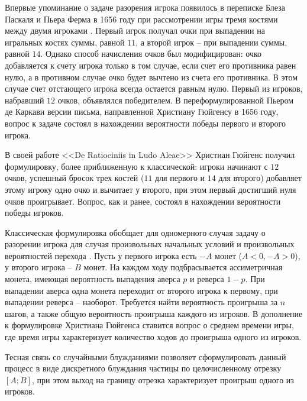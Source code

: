 Впервые упоминание о задаче разорения игрока появилось в переписке Блеза Паскаля и Пьера Ферма в 1656 году при рассмотрении игры тремя костями между двумя игроками \cite{renyi_1980}. Первый игрок получал очки при выпадении на игральных костях суммы, равной $11$, а второй игрок -- при выпадении суммы, равной $14$. Однако способ начисления очков был модифицирован: очко добавляется к счету игрока только в том случае, если счет его противника равен нулю, а в противном случае очко будет вычтено из счета его противника. В этом случае счет отстающего игрока всегда остается равным нулю. Первый из игроков, набравший $12$ очков, объявлялся победителем. В переформулированной Пьером де Каркави версии письма, направленной Христиану Гюйгенсу в 1656 году, вопрос к задаче состоял в нахождении вероятности победы первого и второго игрока. 

В своей работе <<De Ratiociniis in Ludo Aleae>> Христиан Гюйгенс \cite{hald_history_2003,huygens_christiani_1714} получил формулировку, более приближенную к классической: игроки начинают с $12$ очков, успешный бросок  трех костей ($11$ для первого и $14$ для второго) добавляет этому игроку одно очко и вычитает у второго, при этом первый достигший нуля очков проигрывает. Вопрос, как и ранее, состоял в нахождении вероятности победы игроков. 

Классическая формулировка обобщает для одномерного случая задачу о разорении игрока для случая произвольных начальных условий и произвольных вероятностей перехода \cite{feller_introduction_1968}. Пусть у первого игрока есть $-A$ монет ($A < 0, -A > 0$), у второго игрока -- $B$ монет. На каждом ходу подбрасывается ассиметричная монета, имеющая вероятность выпадения аверса $p$ и реверса $1-p$. При выпадении аверса одна монета переходит от второго игрока к первому, при выпадении реверса -- наоборот. Требуется найти вероятность проигрыша за $n$ шагов, а также общую вероятность проигрыша каждого из игроков. В дополнение к формулировке Христиана Гюйгенса ставится вопрос о среднем времени игры, где время игры характеризует количество ходов до проигрыша одного из игроков.

Тесная связь со случайными блужданиями позволяет сформулировать данный процесс в виде дискретного блуждания частицы по целочисленному отрезку $[A; B]$, при этом выход на границу отрезка характеризует проигрыш одного из игроков. \cite{shiryaev_2021} 

